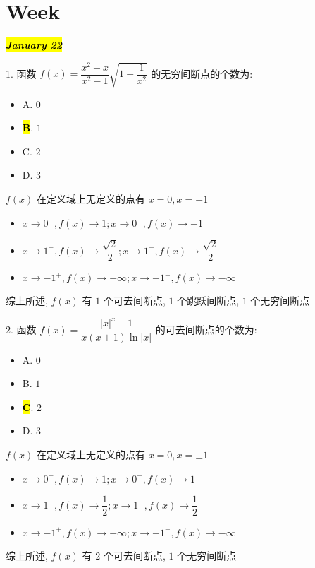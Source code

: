 \section{Week }
\hl{\textbf{\textit{January 22}}}

1. 函数 $f(x)=\dfrac{x^{2}-x}{x^{2}-1}\sqrt{1+\dfrac{1}{x^{2}}}$ 的无穷间断点的个数为:
\begin{itemize}
	\item A. $0$
	\item \hl{\textbf{B}}. $1$
	\item C. $2$
	\item D. $3$
\end{itemize}
\begin{solution}

	$f(x)$ 在定义域上无定义的点有 $x=0, x=\pm 1$
	\begin{itemize}
		\item $x\to 0^{+}, f(x)\to 1 ; x\to 0^{-}, f(x)\to -1$
		\item $x\to 1^{+}, f(x)\to \dfrac{\sqrt{2}}{2} ; x\to 1^{-}, f(x)\to \dfrac{\sqrt{2}}{2}$
		\item $x\to -1^{+}, f(x)\to +\infty ; x\to -1^{-}, f(x)\to -\infty$
	\end{itemize}

	综上所述, $f(x)$ 有 $1$ 个可去间断点, $1$ 个跳跃间断点, $1$ 个无穷间断点
\end{solution}

2. 函数 $f(x)=\dfrac{|x|^{x}-1}{x(x+1)\ln|x|}$ 的可去间断点的个数为:
\begin{itemize}
	\item A. $0$
	\item B. $1$
	\item \hl{\textbf{C}}. $2$
	\item D. $3$
\end{itemize}
\begin{solution}

	$f(x)$ 在定义域上无定义的点有 $x=0, x=\pm 1$
	\begin{itemize}
		\item $x\to 0^{+}, f(x)\to 1 ; x\to 0^{-}, f(x)\to 1$
		\item $x\to 1^{+}, f(x)\to \dfrac{1}{2} ; x\to 1^{-}, f(x)\to \dfrac{1}{2}$
		\item $x\to -1^{+}, f(x)\to +\infty ; x\to -1^{-}, f(x)\to -\infty$
	\end{itemize}

	综上所述, $f(x)$ 有 $2$ 个可去间断点, $1$ 个无穷间断点
\end{solution}

